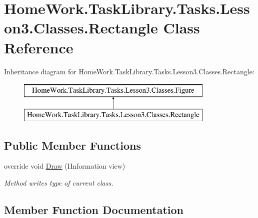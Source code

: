 \hypertarget{class_home_work_1_1_task_library_1_1_tasks_1_1_lesson3_1_1_classes_1_1_rectangle}{}\section{Home\+Work.\+Task\+Library.\+Tasks.\+Lesson3.\+Classes.\+Rectangle Class Reference}
\label{class_home_work_1_1_task_library_1_1_tasks_1_1_lesson3_1_1_classes_1_1_rectangle}
Inheritance diagram for Home\+Work.\+Task\+Library.\+Tasks.\+Lesson3.\+Classes.\+Rectangle\+:\begin{figure}[H]
\begin{center}
\leavevmode
\includegraphics[height=2.000000cm]{class_home_work_1_1_task_library_1_1_tasks_1_1_lesson3_1_1_classes_1_1_rectangle}
\end{center}
\end{figure}
\subsection*{Public Member Functions}
\begin{DoxyCompactItemize}
\item 
override void \mbox{\hyperlink{class_home_work_1_1_task_library_1_1_tasks_1_1_lesson3_1_1_classes_1_1_rectangle_a28c3ba3c0b3e01c16d86db7777f59cf0}{Draw}} (I\+Information view)
\begin{DoxyCompactList}\small\item\em Method writes type of current class. \end{DoxyCompactList}\end{DoxyCompactItemize}


\subsection{Member Function Documentation}
\mbox{\label{class_home_work_1_1_task_library_1_1_tasks_1_1_lesson3_1_1_classes_1_1_rectangle_a28c3ba3c0b3e01c16d86db7777f59cf0}} 
